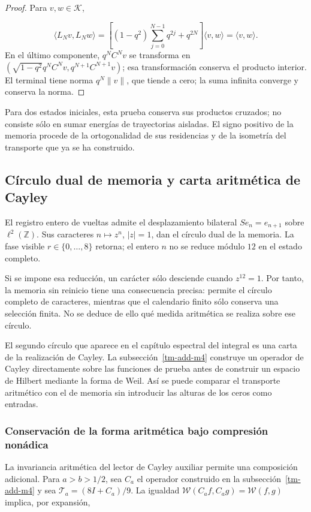 \begin{proof}
Para \(v,w\in\mathcal K\),

\[
\langle L_Nv,L_Nw\rangle
=\left[(1-q^2)\sum_{j=0}^{N-1}q^{2j}+q^{2N}\right]
\langle v,w\rangle=\langle v,w\rangle.
\]
En el último componente, \(q^NC^Nv\) se transforma en \((\sqrt{1-q^2}q^NC^Nv,q^{N+1}C^{N+1}v)\); esa transformación conserva el producto interior. El terminal tiene norma \(q^N\|v\|\), que tiende a cero; la suma infinita converge y conserva la norma.
\end{proof}

Para dos estados iniciales, esta prueba conserva sus productos cruzados; no consiste sólo en sumar energías de trayectorias aisladas. El signo positivo de la memoria procede de la ortogonalidad de sus residencias y de la isometría del transporte que ya se ha construido.


\subsection{Círculo dual de memoria y carta aritmética de Cayley}
\label{tm-add-c4}
El registro entero de vueltas admite el desplazamiento bilateral \(Se_n=e_{n+1}\) sobre \(\ell^2(\mathbb Z)\). Sus caracteres \(n\mapsto z^n\), \(|z|=1\), dan el círculo dual de la memoria. La fase visible \(r\in\{0,\ldots,8\}\) retorna; el entero \(n\) no se reduce módulo \(12\) en el estado completo.

Si se impone esa reducción, un carácter sólo desciende cuando \(z^{12}=1\). Por tanto, la memoria sin reinicio tiene una consecuencia precisa: permite el círculo completo de caracteres, mientras que el calendario finito sólo conserva una selección finita. No se deduce de ello qué medida aritmética se realiza sobre ese círculo.

El segundo círculo que aparece en el capítulo espectral del integral es una carta de la realización de Cayley. La subsección~\ref{tm-add-m4} construye un operador de Cayley directamente sobre las funciones de prueba antes de construir un espacio de Hilbert mediante la forma de Weil. Así se puede comparar el transporte aritmético con el de memoria sin introducir las alturas de los ceros como entradas.


\subsubsection{Conservación de la forma aritmética bajo compresión nonádica}
\label{tm-add-c4-1}
La invariancia aritmética del lector de Cayley auxiliar permite una composición adicional. Para \(a>b>1/2\), sea \(C_a\) el operador construido en la subsección~\ref{tm-add-m4} y sea \(\mathcal T_a=(8I+C_a)/9\). La igualdad \(\mathscr W(C_af,C_ag)=\mathscr W(f,g)\) implica, por expansión,

